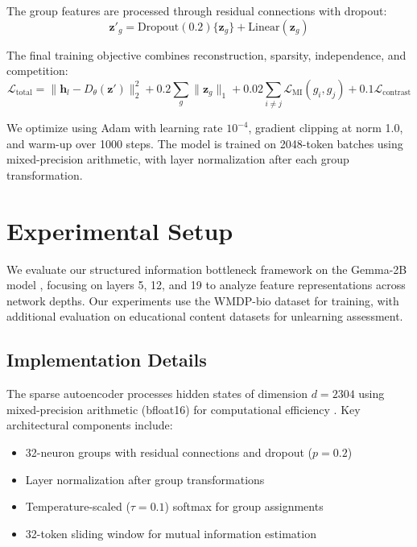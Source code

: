 \documentclass{article} %
\begin{document}
The group features are processed through residual connections with dropout:
\begin{equation}
    \mathbf{z}'_g = \text{Dropout}(0.2)\{\mathbf{z}_g\} + \text{Linear}(\mathbf{z}_g)
\end{equation}

The final training objective combines reconstruction, sparsity, independence, and competition:
\begin{equation}
    \mathcal{L}_{\text{total}} = \|\mathbf{h}_l - D_{\theta}(\mathbf{z}')\|_2^2 + 0.2 \sum_g \|\mathbf{z}_g\|_1 + 0.02 \sum_{i \neq j} \mathcal{L}_{\text{MI}}(g_i, g_j) + 0.1 \mathcal{L}_{\text{contrast}}
\end{equation}

We optimize using Adam with learning rate $10^{-4}$, gradient clipping at norm 1.0, and warm-up over 1000 steps. The model is trained on 2048-token batches using mixed-precision arithmetic, with layer normalization after each group transformation.

\section{Experimental Setup}
\label{sec:experimental}

We evaluate our structured information bottleneck framework on the Gemma-2B model \cite{gpt4}, focusing on layers 5, 12, and 19 to analyze feature representations across network depths. Our experiments use the WMDP-bio dataset for training, with additional evaluation on educational content datasets for unlearning assessment.

\subsection{Implementation Details}
The sparse autoencoder processes hidden states of dimension $d=2304$ using mixed-precision arithmetic (bfloat16) for computational efficiency \cite{paszke2019pytorch}. Key architectural components include:

\begin{itemize}
    \item 32-neuron groups with residual connections and dropout ($p=0.2$)
    \item Layer normalization after group transformations \cite{ba2016layer}
    \item Temperature-scaled ($\tau=0.1$) softmax for group assignments
    \item 32-token sliding window for mutual information estimation
\end{itemize}
\end{document}
